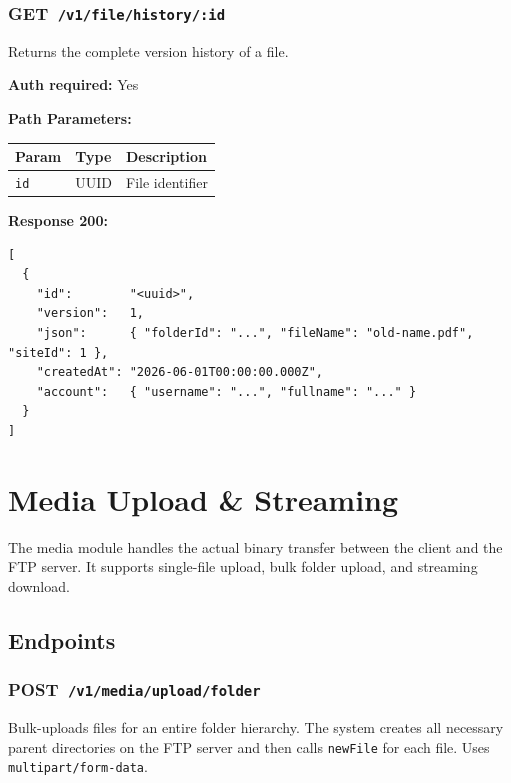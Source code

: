 \documentclass[12pt,a4paper]{article}
\newcommand{\httpget}[1]{%
  \colorbox{getcolor!20}{\textcolor{getcolor}{\textbf{\small GET}}}~\texttt{#1}%
}
\newcommand{\httppost}[1]{%
  \colorbox{postcolor!20}{\textcolor{postcolor}{\textbf{\small POST}}}~\texttt{#1}%
}
\begin{document}
\vspace{0.5em}
\subsubsection{\httpget{/v1/file/history/:id}}

Returns the complete version history of a file.

\textbf{Auth required:} Yes

\textbf{Path Parameters:}

\begin{tabularx}{\linewidth}{llX}
\toprule
\textbf{Param} & \textbf{Type} & \textbf{Description} \\
\midrule
\texttt{id} & UUID & File identifier \\
\bottomrule
\end{tabularx}

\textbf{Response 200:}
\begin{lstlisting}
[
  {
    "id":        "<uuid>",
    "version":   1,
    "json":      { "folderId": "...", "fileName": "old-name.pdf", "siteId": 1 },
    "createdAt": "2026-06-01T00:00:00.000Z",
    "account":   { "username": "...", "fullname": "..." }
  }
]
\end{lstlisting}

\newpage

\section{Media Upload \& Streaming}

The media module handles the actual binary transfer between the client and the FTP server. It supports single-file upload, bulk folder upload, and streaming download.

\subsection{Endpoints}

\subsubsection{\httppost{/v1/media/upload/folder}}

Bulk-uploads files for an entire folder hierarchy. The system creates all necessary parent directories on the FTP server and then calls \texttt{newFile} for each file. Uses \texttt{multipart/form-data}.
\end{document}
